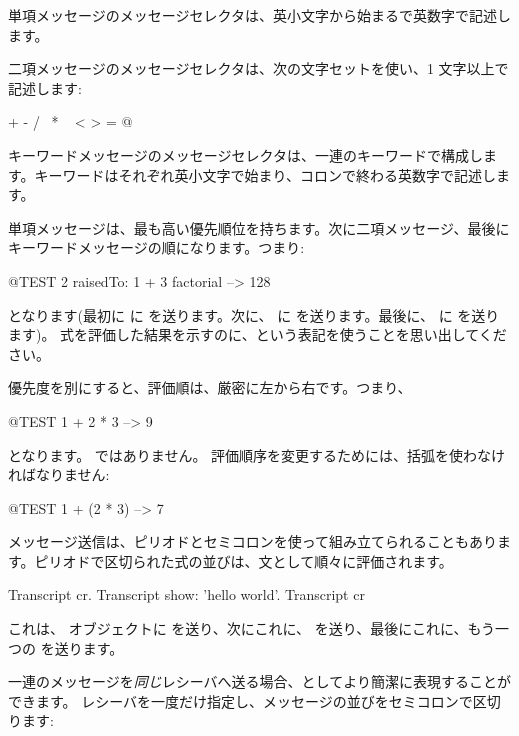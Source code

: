\documentclass[a4paper,10pt,twoside]{book}
\begin{document}
単項メッセージのメッセージセレクタは、英小文字から始まるで英数字で記述します。

二項メッセージのメッセージセレクタは、次の文字セットを使い、1 文字以上で記述します:
\begin{code}{}
+ - / \ * ~ < > = @ %
\end{code}
\noindent
キーワードメッセージのメッセージセレクタは、一連のキーワードで構成します。キーワードはそれぞれ英小文字で始まり、コロンで終わる英数字で記述します。

単項メッセージは、最も高い優先順位を持ちます。次に二項メッセージ、最後にキーワードメッセージの順になります。つまり:
\begin{code}{@TEST}
2 raisedTo: 1 + 3 factorial --> 128
\end{code}
となります(最初に  に  を送ります。次に、 に  を送ります。最後に、 に  を送ります)。
式を評価した結果を示すのに、\ct{-->}という表記を使うことを思い出してください。

優先度を別にすると、評価順は、厳密に左から右です。つまり、
\begin{code}{@TEST}
1 + 2 * 3 --> 9
\end{code}
となります。 ではありません。
評価順序を変更するためには、括弧を使わなければなりません:
\begin{code}{@TEST}
1 + (2 * 3) --> 7
\end{code}

メッセージ送信は、ピリオドとセミコロンを使って組み立てられることもあります。ピリオドで区切られた式の並びは、文として順々に評価されます。

\begin{code}{}
Transcript cr.
Transcript show: 'hello world'.
Transcript cr
\end{code}

\noindent
これは、 オブジェクトに  を送り、次にこれに、 を送り、最後にこれに、もう一つの  を送ります。

一連のメッセージを\emph{同じ}レシーバへ送る場合、としてより簡潔に表現することができます。
レシーバを一度だけ指定し、メッセージの並びをセミコロンで区切ります:
\end{document}

